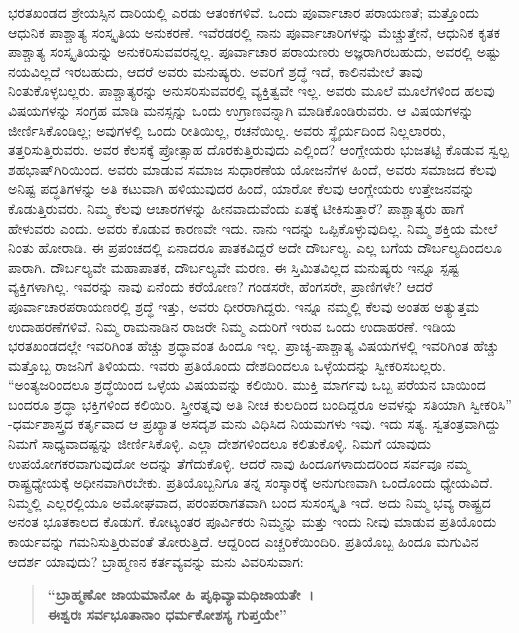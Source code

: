 ಭರತಖಂಡದ ಶ್ರೇಯಸ್ಸಿನ ದಾರಿಯಲ್ಲಿ ಎರಡು ಆತಂಕಗಳಿವೆ. ಒಂದು ಪೂರ್ವಾಚಾರ ಪರಾಯಣತೆ; ಮತ್ತೊಂದು ಆಧುನಿಕ ಪಾಶ್ಚಾತ್ಯ ಸಂಸ್ಕೃತಿಯ ಅನುಕರಣೆ. ಇವೆರಡರಲ್ಲಿ ನಾನು ಪೂರ್ವಾಚಾರಿಗಳನ್ನು ಮೆಚ್ಚುತ್ತೇನೆ, ಆಧುನಿಕ ಕೃತಕ ಪಾಶ್ಚಾತ್ಯ ಸಂಸ್ಕೃತಿಯನ್ನು ಅನುಕರಿಸುವವರನ್ನಲ್ಲ. ಪೂರ್ವಾಚಾರ ಪರಾಯಣರು ಅಜ್ಞರಾಗಿರಬಹುದು, ಅವರಲ್ಲಿ ಅಷ್ಟು ನಯವಿಲ್ಲದೆ ಇರಬಹುದು, ಆದರೆ ಅವರು ಮನುಷ್ಯರು. ಅವರಿಗೆ ಶ್ರದ್ಧೆ ಇದೆ, ಕಾಲಿನಮೇಲೆ ತಾವು ನಿಂತುಕೊಳ್ಳಬಲ್ಲರು. ಪಾಶ್ಚಾತ್ಯರನ್ನು ಅನುಸರಿಸುವವರಲ್ಲಿ ವ್ಯಕ್ತಿತ್ವವೇ ಇಲ್ಲ. ಅವರು ಮೂಲೆ ಮೂಲೆಗಳಿಂದ ಹಲವು ವಿಷಯಗಳನ್ನು ಸಂಗ್ರಹ ಮಾಡಿ ಮನಸ್ಸನ್ನು ಒಂದು ಉಗ್ರಾಣವನ್ನಾಗಿ ಮಾಡಿಕೊಂಡಿರುವರು. ಆ ವಿಷಯಗಳನ್ನು ಜೀರ್ಣಿಸಿಕೊಂಡಿಲ್ಲ; ಅವುಗಳಲ್ಲಿ ಒಂದು ರೀತಿಯಿಲ್ಲ, ರಚನೆಯಿಲ್ಲ. ಅವರು ಸ್ಥೈರ್ಯದಿಂದ ನಿಲ್ಲಲಾರರು, ತತ್ತರಿಸುತ್ತಿರುವರು. ಅವರ ಕೆಲಸಕ್ಕೆ ಪ್ರೋತ್ಸಾಹ ದೊರಕುತ್ತಿರುವುದು ಎಲ್ಲಿಂದ? ಆಂಗ್ಲೇಯರು ಭುಜತಟ್ಟಿ ಕೊಡುವ ಸ್ವಲ್ಪ ಶಹಭಾಷ್​ಗಿರಿಯಿಂದ. ಅವರು ಮಾಡುವ ಸಮಾಜ ಸುಧಾರಣೆಯ ಯೋಜನೆಗಳ ಹಿಂದೆ, ಅವರು ಸಮಾಜದ ಕೆಲವು ಅನಿಷ್ಟ ಪದ್ಧತಿಗಳನ್ನು ಅತಿ ಕಟುವಾಗಿ ಹಳಿಯುವುದರ ಹಿಂದೆ, ಯಾರೋ ಕೆಲವು ಆಂಗ್ಲೇಯರು ಉತ್ತೇಜನವನ್ನು ಕೊಡುತ್ತಿರುವರು. ನಿಮ್ಮ ಕೆಲವು ಆಚಾರಗಳನ್ನು ಹೀನವಾದುವೆಂದು ಏತಕ್ಕೆ ಟೀಕಿಸುತ್ತಾರೆ? ಪಾಶ್ಚಾತ್ಯರು ಹಾಗೆ ಹೇಳುವರು ಎಂದು. ಅವರು ಕೊಡುವ ಕಾರಣವೇ ಇದು. ನಾನು ಇದನ್ನು ಒಪ್ಪಿಕೊಳ್ಳುವುದಿಲ್ಲ. ನಿಮ್ಮ ಶಕ್ತಿಯ ಮೇಲೆ ನಿಂತು ಹೋರಾಡಿ. ಈ ಪ್ರಪಂಚದಲ್ಲಿ ಏನಾದರೂ ಪಾತಕವಿದ್ದರೆ ಅದೇ ದೌರ್ಬಲ್ಯ. ಎಲ್ಲ ಬಗೆಯ ದೌರ್ಬಲ್ಯದಿಂದಲೂ ಪಾರಾಗಿ. ದೌರ್ಬಲ್ಯವೇ ಮಹಾಪಾತಕ, ದೌರ್ಬಲ್ಯವೇ ಮರಣ. ಈ ಸ್ತಿಮಿತವಿಲ್ಲದ ಮನುಷ್ಯರು ಇನ್ನೂ ಸ್ಪಷ್ಟ ವ್ಯಕ್ತಿಗಳಾಗಿಲ್ಲ. ಇವರನ್ನು ನಾವು ಏನೆಂದು ಕರೆಯೋಣ? ಗಂಡಸರೇ, ಹೆಂಗಸರೇ, ಪ್ರಾಣಿಗಳೇ? ಆದರೆ ಪೂರ್ವಾಚಾರ\break ಪರಾಯಣರಲ್ಲಿ ಶ್ರದ್ಧೆ ಇತ್ತು, ಅವರು ಧೀರರಾಗಿದ್ದರು. ಇನ್ನೂ ನಮ್ಮಲ್ಲಿ ಕೆಲವು ಅಂತಹ ಅತ್ಯುತ್ತಮ ಉದಾಹರಣೆಗಳಿವೆ. ನಿಮ್ಮ ರಾಮನಾಡಿನ ರಾಜರೇ ನಿಮ್ಮ ಎದುರಿಗೆ ಇರುವ ಒಂದು ಉದಾಹರಣೆ. ಇಡಿಯ ಭರತಖಂಡದಲ್ಲೇ ಇವರಿಗಿಂತ ಹೆಚ್ಚು ಶ್ರದ್ಧಾವಂತ ಹಿಂದೂ ಇಲ್ಲ. ಪ್ರಾಚ್ಯ-ಪಾಶ್ಚಾತ್ಯ ವಿಷಯಗಳಲ್ಲಿ ಇವರಿಗಿಂತ ಹೆಚ್ಚು ಮತ್ತೊಬ್ಬ ರಾಜನಿಗೆ ತಿಳಿಯದು. ಇವರು ಪ್ರತಿಯೊಂದು ದೇಶದಿಂದಲೂ ಒಳ್ಳೆಯದನ್ನು ಸ್ವೀಕರಿಸಬಲ್ಲರು. “ಅಂತ್ಯಜರಿಂದಲೂ ಶ್ರದ್ಧೆಯಿಂದ ಒಳ್ಳೆಯ ವಿಷಯವನ್ನು ಕಲಿಯಿರಿ. ಮುಕ್ತಿ ಮಾರ್ಗವು ಒಬ್ಬ ಪರೆಯನ ಬಾಯಿಂದ ಬಂದರೂ ಶ್ರದ್ಧಾ ಭಕ್ತಿಗಳಿಂದ ಕಲಿಯಿರಿ. ಸ್ತ್ರೀರತ್ನವು ಅತಿ ನೀಚ ಕುಲದಿಂದ ಬಂದಿದ್ದರೂ ಅವಳನ್ನು ಸತಿಯಾಗಿ ಸ್ವೀಕರಿಸಿ” -ಧರ್ಮಶಾಸ್ತ್ರದ ಕರ್ತೃವಾದ ಆ ಪ್ರಖ್ಯಾತ ಅಸದೃಶ ಮನು ವಿಧಿಸಿದ ನಿಯಮಗಳು ಇವು. ಇದು ಸತ್ಯ. ಸ್ವತಂತ್ರವಾಗಿದ್ದು ನಿಮಗೆ ಸಾಧ್ಯವಾದಷ್ಟನ್ನು ಜೀರ್ಣಿಸಿಕೊಳ್ಳಿ. ಎಲ್ಲಾ ದೇಶಗಳಿಂದಲೂ ಕಲಿತುಕೊಳ್ಳಿ. ನಿಮಗೆ ಯಾವುದು ಉಪಯೋಗಕರವಾಗುವುದೋ ಅದನ್ನು ತೆಗೆದುಕೊಳ್ಳಿ. ಆದರೆ ನಾವು ಹಿಂದೂಗಳಾದುದರಿಂದ ಸರ್ವವೂ ನಮ್ಮ ರಾಷ್ಟ್ರಧ್ಯೇಯಕ್ಕೆ ಅಧೀನವಾಗಿರಬೇಕು. ಪ್ರತಿಯೊಬ್ಬನಿಗೂ ತನ್ನ ಸಂಸ್ಕಾರಕ್ಕೆ ಅನುಗುಣವಾಗಿ ಒಂದೊಂದು ಧ್ಯೇಯವಿದೆ. ನಿಮ್ಮಲ್ಲಿ ಎಲ್ಲರಲ್ಲಿಯೂ ಅಮೋಘವಾದ, ಪರಂಪರಾಗತವಾಗಿ ಬಂದ ಸುಸಂಸ್ಕೃತಿ ಇದೆ. ಅದು ನಿಮ್ಮ ಭವ್ಯ ರಾಷ್ಟ್ರದ ಅನಂತ ಭೂತಕಾಲದ ಕೊಡುಗೆ. ಕೋಟ್ಯಂತರ ಪೂರ್ವಿಕರು ನಿಮ್ಮನ್ನು ಮತ್ತು ಇಂದು ನೀವು ಮಾಡುವ ಪ್ರತಿಯೊಂದು ಕಾರ್ಯವನ್ನು ಗಮನಿಸುತ್ತಿರುವಂತೆ ತೋರುತ್ತಿದೆ. ಆದ್ದರಿಂದ ಎಚ್ಚರಿಕೆಯಿಂದಿರಿ. ಪ್ರತಿಯೊಬ್ಬ ಹಿಂದೂ ಮಗುವಿನ ಆದರ್ಶ ಯಾವುದು? ಬ್ರಾಹ್ಮಣನ ಕರ್ತವ್ಯವನ್ನು ಮನು ವಿವರಿಸುವಾಗ:

\begin{verse}
\textbf{“ಬ್ರಾಹ್ಮಣೋ ಜಾಯಮಾನೋ ಹಿ ಪೃಥಿವ್ಯಾಮಧಿಜಾಯತೇ~।}\\\textbf{ಈಶ್ವರಃ ಸರ್ವಭೂತಾನಾಂ ಧರ್ಮಕೋಶಸ್ಯ ಗುಪ್ತಯೇ”}
\end{verse}

